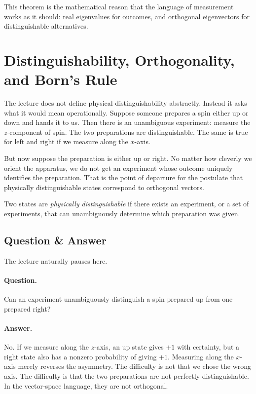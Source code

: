 This theorem is the mathematical reason that the language of measurement works as it should: real eigenvalues for outcomes, and orthogonal eigenvectors for distinguishable alternatives.

\section{Distinguishability, Orthogonality, and Born's Rule}

The lecture does not define physical distinguishability abstractly. Instead it asks what it would mean operationally. Suppose someone prepares a spin either up or down and hands it to us. Then there is an unambiguous experiment: measure the \(z\)-component of spin. The two preparations are distinguishable. The same is true for left and right if we measure along the \(x\)-axis.

But now suppose the preparation is either up or right. No matter how cleverly we orient the apparatus, we do not get an experiment whose outcome uniquely identifies the preparation. That is the point of departure for the postulate that physically distinguishable states correspond to orthogonal vectors.

\begin{definition}
Two states are \emph{physically distinguishable} if there exists an experiment, or a set of experiments, that can unambiguously determine which preparation was given.
\end{definition}

\subsection{Question \& Answer}

The lecture naturally pauses here.

\paragraph{Question.} Can an experiment unambiguously distinguish a spin prepared up from one prepared right?

\paragraph{Answer.} No. If we measure along the \(z\)-axis, an up state gives \(+1\) with certainty, but a right state also has a nonzero probability of giving \(+1\). Measuring along the \(x\)-axis merely reverses the asymmetry. The difficulty is not that we chose the wrong axis. The difficulty is that the two preparations are not perfectly distinguishable. In the vector-space language, they are not orthogonal.

